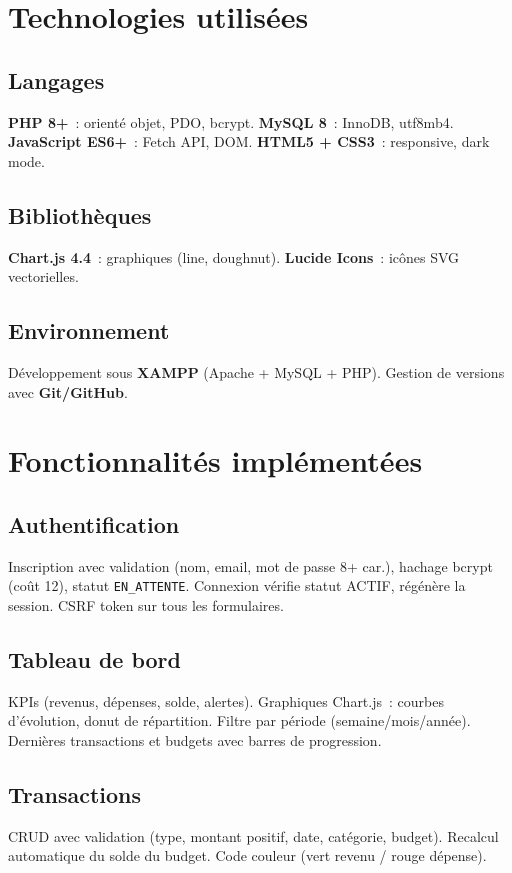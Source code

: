 \documentclass[12pt,a4paper,twoside]{report}
\begin{document}
\chapter{Technologies utilisées}

\section{Langages}
\textbf{PHP 8+}~: orienté objet, PDO, bcrypt. \textbf{MySQL 8}~: InnoDB, utf8mb4. \textbf{JavaScript ES6+}~: Fetch API, DOM. \textbf{HTML5 + CSS3}~: responsive, dark mode.

\section{Bibliothèques}
\textbf{Chart.js 4.4}~: graphiques (line, doughnut). \textbf{Lucide Icons}~: icônes SVG vectorielles.

\section{Environnement}
Développement sous \textbf{XAMPP} (Apache + MySQL + PHP). Gestion de versions avec \textbf{Git/GitHub}.

\chapter{Fonctionnalités implémentées}

\section{Authentification}
Inscription avec validation (nom, email, mot de passe 8+ car.), hachage bcrypt (coût 12), statut \texttt{EN\_ATTENTE}. Connexion vérifie statut ACTIF, régénère la session. CSRF token sur tous les formulaires.

\section{Tableau de bord}
KPIs (revenus, dépenses, solde, alertes). Graphiques Chart.js~: courbes d'évolution, donut de répartition. Filtre par période (semaine/mois/année). Dernières transactions et budgets avec barres de progression.

\section{Transactions}
CRUD avec validation (type, montant positif, date, catégorie, budget). Recalcul automatique du solde du budget. Code couleur (vert revenu / rouge dépense).
\end{document}
